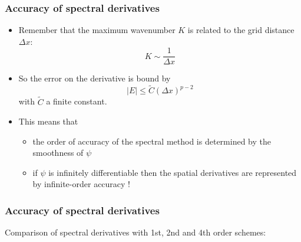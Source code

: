 \documentclass[aspectratio=43,9pt]{beamer}
\begin{document}
\begin{frame}
	\frametitle{Accuracy of spectral derivatives}
	\vfill\begin{itemize}
		\item Remember that the maximum wavenumber $K$ is related to the grid distance $\Delta x$:
			\begin{equation*}
				K\sim\frac{1}{\Delta x}
			\end{equation*}\vfill
		\item So the error on the derivative is bound by
			\begin{equation*}
				\vert E \vert \le \tilde C \left( \Delta x \right)^{p-2}
			\end{equation*}
			with $\tilde C$ a finite constant.\vfill
		\item This means that\vfill
			\begin{itemize}
				 \item the order of accuracy of the spectral method is determined by the smoothness of $\psi$
				 \item if $\psi$ is infinitely differentiable then the spatial derivatives are represented by infinite-order accuracy !
			\end{itemize}
	\end{itemize}\vfill
\end{frame}
%
%
\begin{frame}
	\frametitle{Accuracy of spectral derivatives}
	\par
	Comparison of spectral derivatives with 1st, 2nd and 4th order schemes:
	\begin{center}
		\scalebox{.95}{\small}
	\end{center}
\end{frame}
%
%
\end{document}
